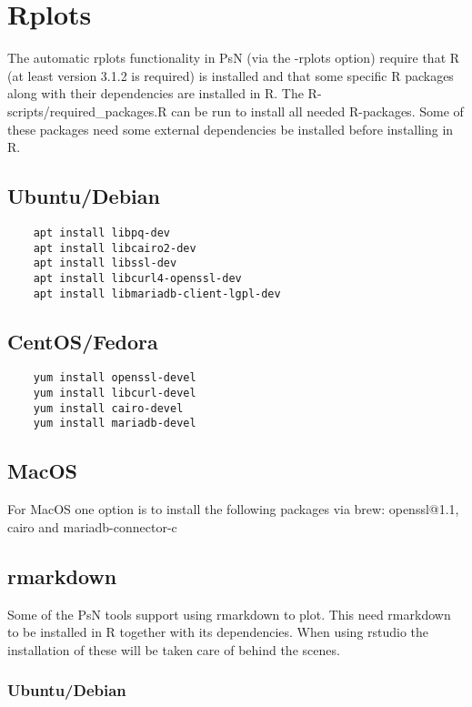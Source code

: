 \section{Rplots}

The automatic rplots functionality in PsN (via the -rplots option) require that R (at least version 3.1.2 is required) is installed and that some specific R packages along with their dependencies are installed in R. The R-scripts/required\_packages.R can be run to install all needed R-packages. Some of these packages need some external dependencies be installed before installing in R.

\subsection{Ubuntu/Debian}
\begin{verbatim}
    apt install libpq-dev
    apt install libcairo2-dev
    apt install libssl-dev
    apt install libcurl4-openssl-dev
    apt install libmariadb-client-lgpl-dev
\end{verbatim}

\subsection{CentOS/Fedora}
\begin{verbatim}
    yum install openssl-devel
    yum install libcurl-devel
    yum install cairo-devel
    yum install mariadb-devel
\end{verbatim}

\subsection{MacOS}
For MacOS one option is to install the following packages via brew: openssl@1.1, cairo and mariadb-connector-c


\subsection{rmarkdown}

Some of the PsN tools support using rmarkdown to plot. This need rmarkdown to be installed in R together with its dependencies. When using rstudio the installation of these will be taken care of behind the scenes.

\subsubsection{Ubuntu/Debian}

